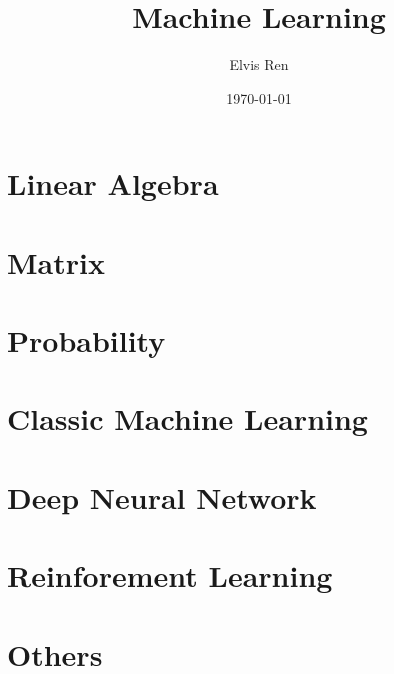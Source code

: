 \documentclass[reqno]{book}
\begin{document}
\title{Machine Learning}
\author{Elvis Ren}
\date{\today}

\maketitle
\tableofcontents





\chapter{Linear Algebra}








\chapter{Matrix}



\chapter{Probability}




\chapter{Classic Machine Learning}



\chapter {Deep Neural Network}


\chapter{Reinforement Learning}



 









\chapter{Others}




\printindex
\end{document}
